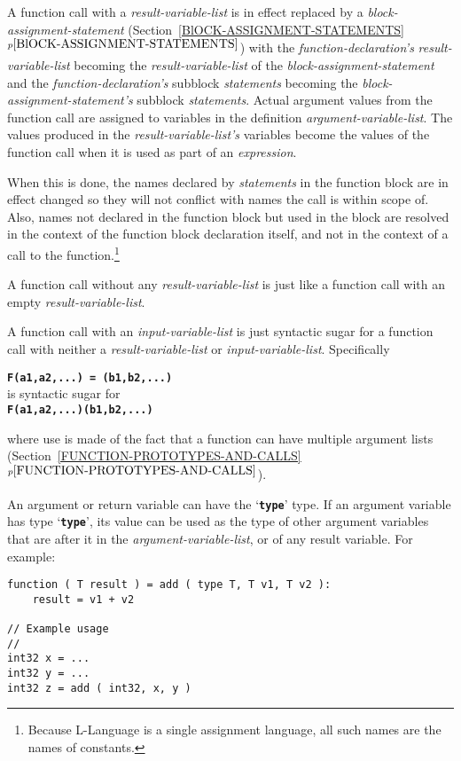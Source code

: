 \documentclass[12pt]{article}
\newcommand{\TT}[1]{{\tt \bfseries #1}}
\newcommand{\itemref}[1]{\ref{#1}$^{p\pageref{#1}}$}
\newcommand{\EOL}{\penalty \exhyphenpenalty}
\newenvironment{indpar}[1][0.3in]%
	{\begin{list}{}%
		     {\setlength{\itemsep}{0in}%
		      \setlength{\topsep}{0in}%
		      \setlength{\parsep}{1ex}%
		      \setlength{\labelwidth}{#1}%
		      \setlength{\leftmargin}{#1}%
		      \addtolength{\leftmargin}{\labelsep}}%
	 \item}%
	{\end{list}}
\begin{document}
A function call with a {\em result-variable-list}
is in effect replaced by a {\em block-assignment-statement}
(Section~\itemref{BlOCK-ASSIGNMENT-STATEMENTS})
with the {\em function-declaration's} {\em result-variable-list} becoming the 
{\em result-variable-list} of the {\em block-assignment-statement} and the
{\em function-declaration's} subblock {\em statements} becoming the 
{\em block-\EOL assign\-ment-\EOL state\-ment's} subblock {\em statements}.
Actual argument values from the function call are assigned to variables in
the definition {\em argument-variable-list}.  The values produced in
the {\em result-variable-list's} variables become the values of the
function call when it is used as part of an {\em expression}.

When this is done, the names declared by {\em statements} in the
function block are in effect changed so they will not conflict
with names the call is within scope of.  Also, names not declared
in the function block but used in the block are resolved
in the context of the function block declaration itself,
and not in the context of a call to the function.\footnote{
Because L-Language is a single assignment language, all such
names are the names of constants.}

A function call without any {\em result-variable-list}
is just like a function call with an empty
{\em result-variable-list}.

A function call with an {\em input-variable-list} is just syntactic
sugar for a function call with neither a {\em result-variable-list}
or {\em input-variable-list}.  Specifically
\begin{center}
\TT{F(a1,a2,...)~=~(b1,b2,...)} \\
is syntactic sugar for \\
\TT{F(a1,a2,...)(b1,b2,...)} \\
\end{center}

where use is made of the fact that a function can have multiple
argument lists (Section~\itemref{FUNCTION-PROTOTYPES-AND-CALLS}).

An argument or return variable can have the `\TT{type}' type.
If an argument variable has type `\TT{type}', its value can be used as the
type of other argument variables that are
after it in the {\em argument-variable-list},
or of any result variable.  For example:

\begin{indpar}\begin{verbatim}
function ( T result ) = add ( type T, T v1, T v2 ):
    result = v1 + v2

// Example usage
//
int32 x = ...
int32 y = ...
int32 z = add ( int32, x, y )
\end{verbatim}\end{indpar}
\end{document}
